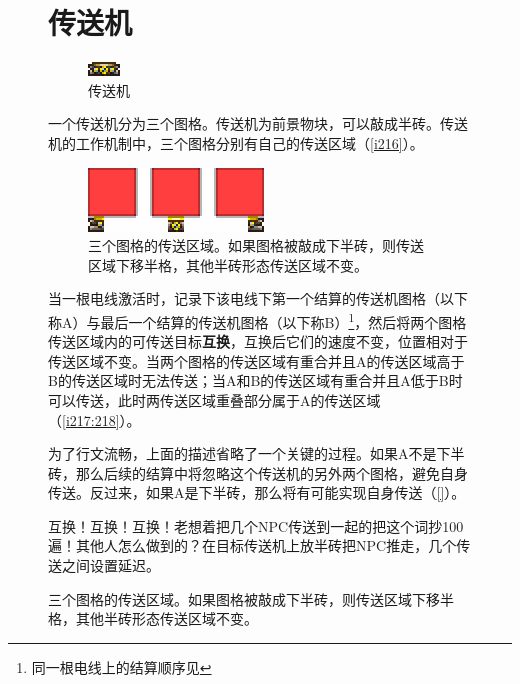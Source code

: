 \begin{figure}[!ht]
\section{传送机}\label{chuansongji}
\begin{figure}[!ht]
\centering
\includegraphics{figures/Teleporter.png}
\caption{传送机}
\end{figure}
一个传送机分为三个图格。传送机为前景物块，可以敲成半砖。传送机的工作机制中，三个图格分别有自己的传送区域（\autoref{i216}）。

\begin{figure}[!ht]
\centering
\includegraphics{images/216.png}
\caption{三个图格的传送区域。如果图格被敲成下半砖，则传送区域下移半格，其他半砖形态传送区域不变。}
\label{i216}
\end{figure}

当一根电线激活时，记录下该电线下第一个结算的传送机图格（以下称A）与最后一个结算的传送机图格（以下称B）\footnote{同一根电线上的结算顺序见}，然后将两个图格传送区域内的可传送目标\textbf{互换}，互换后它们的速度不变，位置相对于传送区域不变。当两个图格的传送区域有重合并且A的传送区域高于B的传送区域时无法传送；当A和B的传送区域有重合并且A低于B时可以传送，此时两传送区域重叠部分属于A的传送区域（\autoref{i217:218}）。

为了行文流畅，上面的描述省略了一个关键的过程。如果A不是下半砖，那么后续的结算中将忽略这个传送机的另外两个图格，避免自身传送。反过来，如果A是下半砖，那么将有可能实现自身传送（\autoref{}）。

\begin{remark}
互换！{\LARGE 互换！}{\huge 互换！}老想着把几个NPC传送到一起的把这个词抄100遍！其他人怎么做到的？在目标传送机上放半砖把NPC推走，几个传送之间设置延迟。
\end{remark}


\end{figure}
